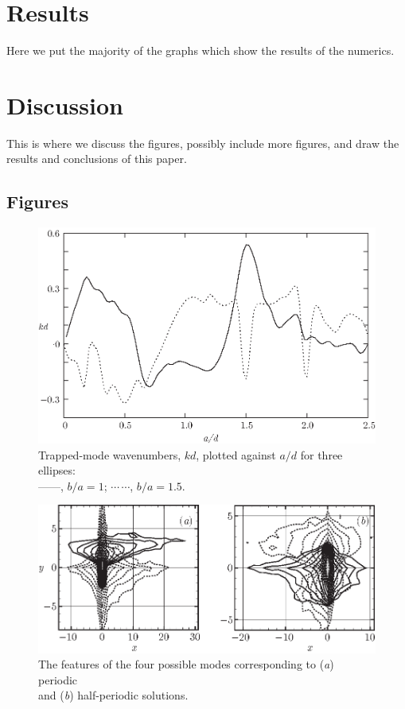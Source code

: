 \documentclass{jfm}
\begin{document}
\section{Results}\label{sec:Results}
Here we put the majority of the graphs which show the results of the numerics.
\section{Discussion}
This is where we discuss the figures, possibly include more figures, and draw
the results and conclusions of this paper.
\subsection{Figures}

\begin{figure}
  \centerline{\includegraphics{trapped}}%
  \caption{Trapped-mode wavenumbers, $kd$, plotted against $a/d$ for
    three ellipses:\protect\\
    ---$\!$---,
    $b/a=1$; $\cdots$\,$\cdots$, $b/a=1.5$.}
\label{fig:ka}
\end{figure}

\begin{figure}
  \centerline{\includegraphics{modes}}
  \caption{The features of the four possible modes corresponding to
  (\textit{a}) periodic\protect\\ and (\textit{b}) half-periodic solutions.}
\label{fig:kd}
\end{figure}
\end{document}
